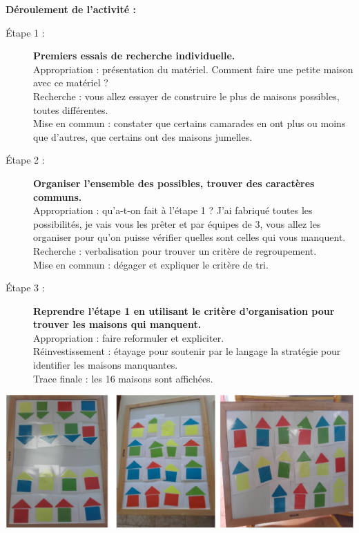 \begin{exercice*}
{\bf Déroulement de l'activité :}
\begin{description}
  \item[Étape 1 :] {\bf Premiers essais de recherche individuelle.} \\
     Appropriation : présentation du matériel. Comment faire une petite maison avec ce matériel ? \\
     Recherche : vous allez essayer de construire le plus de maisons possibles, toutes différentes. \\
     Mise en commun : constater que certains camarades en ont plus ou moins que d’autres, que certains ont des maisons jumelles.
  \item[Étape 2 :] {\bf Organiser l'ensemble des possibles, trouver des caractères communs.} \\
     Appropriation : qu'a-t-on fait à l'étape 1 ? J'ai fabriqué toutes les possibilités, je vais vous les prêter et par équipes de 3, vous allez les organiser pour qu’on puisse vérifier quelles sont celles qui vous manquent. \\
     Recherche : verbalisation pour trouver un critère de regroupement. \\
     Mise en commun : dégager et expliquer le critère de tri.
  \item[Étape 3 :] {\bf Reprendre l'étape 1 en utilisant le critère d'organisation pour trouver les maisons qui manquent.} \\
     Appropriation : faire reformuler et expliciter. \\
     Réinvestissement : étayage pour soutenir par le langage la stratégie pour identifier les maisons manquantes. \\
     Trace finale : les 16 maisons sont affichées.
\end{description}

\medskip

\begin{center}
   \includegraphics[width=14cm]{Nombres_et_calculs_did/Images/Num2_activites_maisons_organisation} 
\end{center}
\end{exercice*}


